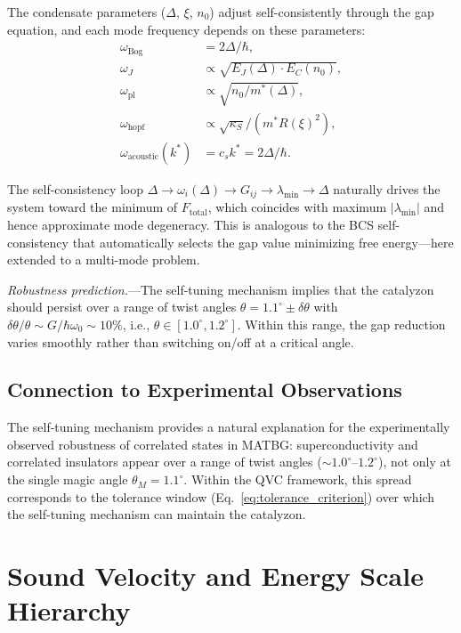\documentclass[11pt,letterpaper]{article}
\begin{document}
The condensate parameters ($\Delta$, $\xi$, $n_0$) adjust self-consistently through the gap equation, and each mode frequency depends on these parameters:
\begin{align}
\omega_{\text{Bog}} &= 2\Delta/\hbar, \\
\omega_J &\propto \sqrt{E_J(\Delta) \cdot E_C(n_0)}, \\
\omega_{\text{pl}} &\propto \sqrt{n_0 / m^*(\Delta)}, \\
\omega_{\text{hopf}} &\propto \sqrt{\kappa_S} / (m^* R(\xi)^2), \\
\omega_{\text{acoustic}}(k^*) &= c_s k^* = 2\Delta / \hbar.
\end{align}

The self-consistency loop $\Delta \to \omega_i(\Delta) \to G_{ij} \to \lambda_{\min} \to \Delta$ naturally drives the system toward the minimum of $F_{\text{total}}$, which coincides with maximum $|\lambda_{\min}|$ and hence approximate mode degeneracy. This is analogous to the BCS self-consistency that automatically selects the gap value minimizing free energy---here extended to a multi-mode problem.

\textit{Robustness prediction.}---The self-tuning mechanism implies that the catalyzon should persist over a range of twist angles $\theta = 1.1^\circ \pm \delta\theta$ with $\delta\theta / \theta \sim G/\hbar\omega_0 \sim 10\%$, i.e., $\theta \in [1.0^\circ, 1.2^\circ]$. Within this range, the gap reduction varies smoothly rather than switching on/off at a critical angle.

\subsection{Connection to Experimental Observations}

The self-tuning mechanism provides a natural explanation for the experimentally observed robustness of correlated states in MATBG: superconductivity and correlated insulators appear over a range of twist angles ($\sim 1.0^\circ$--$1.2^\circ$), not only at the single magic angle $\theta_M = 1.1^\circ$. Within the QVC framework, this spread corresponds to the tolerance window (Eq.~\ref{eq:tolerance_criterion}) over which the self-tuning mechanism can maintain the catalyzon.

\section{Sound Velocity and Energy Scale Hierarchy}
\label{sec:velocity_clarification}
\end{document}
